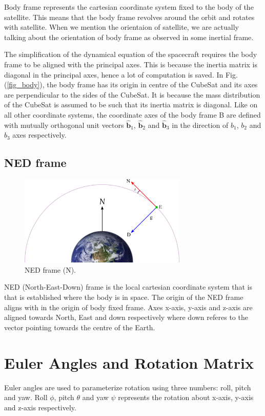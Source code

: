 \documentclass[12pt, a4paper]{article}
\begin{document}
Body frame represents the cartesian coordinate system fixed to the body of the satellite. This means that the body frame revolves around the orbit and rotates with satellite. When we mention the orientaion of satellite, we are actually talking about the orientation of body frame as observed in some inertial frame. \medskip

The simplification of the dynamical equation of the spacecraft requires the body frame to be aligned with the principal axes. This is because the inertia matrix is diagonal in the principal axes, hence a lot of computation is saved. In Fig.\,(\ref{fig_body}), the body frame has its origin in centre of the CubeSat and its axes are perpendicular to the sides of the CubeSat. It is because the mass distribution of the CubeSat is assumed to be such that its inertia matrix is diagonal. Like on all other coordinate systems, the coordinate axes of the body frame B are defined with mutually orthogonal unit vectors $\hat{\bm{b}}_{1}$, $\hat{\bm{b}}_{2}$ and $\hat{\bm{b}}_{3}$ in the direction of  $b_{1}$, $b_{2}$ and $b_{3}$ axes respectively.\medskip

\subsection{NED frame}

\begin{figure}[h] 
    \centering
    \includegraphics[width=8cm]{figs/fig_ned_frame.png}
    \caption{NED frame (N).}
    \label{fig_ned}
\end{figure}

NED (North-East-Down) frame is the local cartesian coordinate system that is that is established where the body is in space. The origin of the NED frame aligns with in the origin of body fixed frame. Axes x-axis, y-axis and z-axis are aligned towards North, East and down respectively where down referes to the vector pointing towards the centre of the Earth.

\section{Euler Angles and Rotation Matrix}
\label{sec_ypr}
Euler angles are used to parameterize rotation using three numbers: roll, pitch and yaw. Roll $\phi$, pitch $\theta$ and yaw $\psi$ represents the rotation about x-axis, y-axis and z-axis respectively. \medskip 
\end{document}
